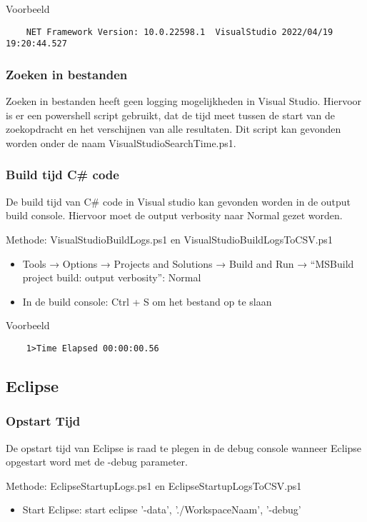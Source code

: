 Voorbeeld
\vspace{\verbatimOffset}
\begin{verbatim}
    NET Framework Version: 10.0.22598.1	 VisualStudio 2022/04/19 19:20:44.527
\end{verbatim}

\subsubsection{Zoeken in bestanden}
Zoeken in bestanden heeft geen logging mogelijkheden in Visual Studio. Hiervoor is er een powershell script gebruikt, dat de tijd meet tussen de start van de zoekopdracht en het verschijnen van alle resultaten. Dit script kan gevonden worden onder de naam VisualStudioSearchTime.ps1.

\subsubsection{Build tijd C\# code}
De build tijd van C\# code in Visual studio kan gevonden worden in de output build console. Hiervoor moet de output verbosity naar Normal gezet worden.

Methode: VisualStudioBuildLogs.ps1 en VisualStudioBuildLogsToCSV.ps1
\begin{itemize}
	\item Tools → Options → Projects and Solutions → Build and Run → “MSBuild project build: output verbosity”: Normal
	\item In de build console: Ctrl + S om het bestand op te slaan
\end{itemize}

Voorbeeld
\vspace{\verbatimOffset}
\begin{verbatim}
    1>Time Elapsed 00:00:00.56    
\end{verbatim}

\subsection{Eclipse}
\subsubsection{Opstart Tijd}
De opstart tijd van Eclipse is raad te plegen in de debug console wanneer Eclipse opgestart word met de -debug parameter.

Methode: EclipseStartupLogs.ps1 en EclipseStartupLogsToCSV.ps1
\begin{itemize}
	\item Start Eclipse: start eclipse  '-data', './WorkspaceNaam', '-debug'
\end{itemize}

